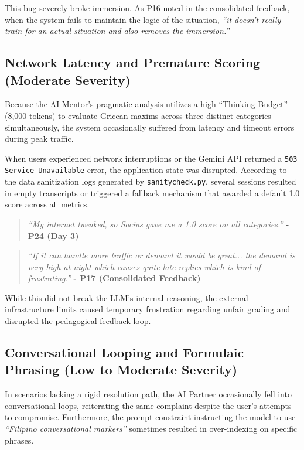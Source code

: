 This bug severely broke immersion. As P16 noted in the consolidated feedback, when the system fails to maintain the logic of the situation, \textit{``it doesn't really train for an actual situation and also removes the immersion.''}

\subsection{Network Latency and Premature Scoring (Moderate Severity)}
Because the AI Mentor's pragmatic analysis utilizes a high ``Thinking Budget'' (8,000 tokens) to evaluate Gricean maxims across three distinct categories simultaneously, the system occasionally suffered from latency and timeout errors during peak traffic. 

When users experienced network interruptions or the Gemini API returned a \texttt{503 Service Unavailable} error, the application state was disrupted. According to the data sanitization logs generated by \texttt{sanitycheck.py}, several sessions resulted in empty transcripts or triggered a fallback mechanism that awarded a default 1.0 score across all metrics.

\begin{quote}
\textit{``My internet tweaked, so Socius gave me a 1.0 score on all categories.''} \textbf{- P24 (Day 3)}
\end{quote}

\begin{quote}
\textit{``If it can handle more traffic or demand it would be great... the demand is very high at night which causes quite late replies which is kind of frustrating.''} \textbf{- P17 (Consolidated Feedback)}
\end{quote}

While this did not break the LLM's internal reasoning, the external infrastructure limits caused temporary frustration regarding unfair grading and disrupted the pedagogical feedback loop.

\subsection{Conversational Looping and Formulaic Phrasing (Low to Moderate Severity)}
In scenarios lacking a rigid resolution path, the AI Partner occasionally fell into conversational loops, reiterating the same complaint despite the user's attempts to compromise. Furthermore, the prompt constraint instructing the model to use \textit{``Filipino conversational markers''} sometimes resulted in over-indexing on specific phrases.

